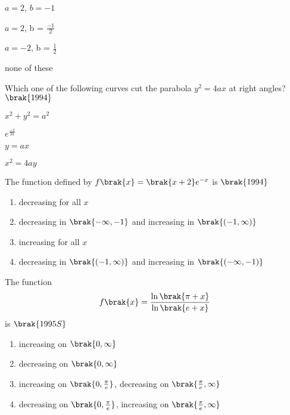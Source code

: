 \begin{enumerate}
\begin{multicols}{2}
	\item $ a = 2$, $b = -1$
	\item $a = 2$, b = $\frac{-1}{2}$
	\item $a = -2$, b = $\frac{1}{2}$
	\item none of these
\end{multicols}
\end{enumerate}

\item Which one of the following curves cut the parabola
$y^2 = 4ax$ at right angles?
\hfill$\brak{1994}$
\begin{enumerate}
\begin{multicols}{2}
	\item $x^2 + y^2 = a^2$
        \item $e^{\frac{-x}{2a}}$
	\item $y = ax$
	\item $x^2 = 4ay$
\end{multicols}
\end{enumerate}

\item The function defined by 
$f\brak{x} = \brak{x+2}e^{-x}$ is
\hfill$\brak{1994}$
\begin{enumerate}
	\item decreasing for all $x$
	\item decreasing in $\brak{-\infty, -1}$ and increasing
		in $\brak{(-1, \infty)}$
        \item increasing for all $x$
	\item decreasing in $\brak{(-1, \infty)}$ and increasing
		in $\brak{(-\infty, -1)}$
\end{enumerate}

\item The function 
\begin{align*}
		f\brak{x} =\frac{\ln \brak{\pi + x}}{\ln \brak{e + x}}
\end{align*} is
\hfill$\brak{1995S}$

\begin{enumerate}
	\item increasing on $\brak{0, \infty}$
	\item decreasing on $\brak{0, \infty}$
	\item increasing on $\brak{0, \frac{\pi}{e}}$,
		decreasing on $\brak{\frac{\pi}{e}, \infty}$
	\item decreasing on $\brak{0, \frac{\pi}{e}}$,
		increasing on $\brak{\frac{\pi}{e}, \infty}$
\end{enumerate}

